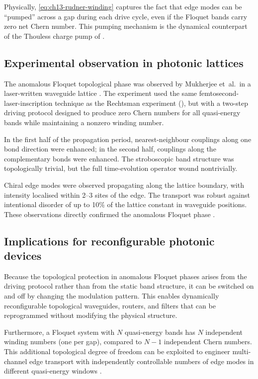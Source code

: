Physically, \eqref{eq:ch13-rudner-winding} captures the fact that edge
modes can be ``pumped'' across a gap during each drive cycle, even if
the Floquet bands carry zero net Chern number.  This pumping mechanism
is the dynamical counterpart of the Thouless charge pump of
 \cite{thouless1982quantized}.

\subsection{Experimental observation in photonic lattices}
\label{sec:ch13-anomalous-exp}

The anomalous Floquet topological phase was observed by Mukherjee
et~al.\ in a laser-written waveguide lattice
\cite{mukherjee2017experimental}.  The experiment used the same
femtosecond-laser-inscription technique as the Rechtsman experiment
(), but with a two-step driving
protocol designed to produce zero Chern numbers for all quasi-energy
bands while maintaining a nonzero winding number.

In the first half of the propagation period, nearest-neighbour
couplings along one bond direction were enhanced; in the second half,
couplings along the complementary bonds were enhanced.  The
stroboscopic band structure was topologically trivial, but the full
time-evolution operator wound nontrivially.

Chiral edge modes were observed propagating along the lattice
boundary, with intensity localised within 2--3 sites of the edge.
The transport was robust against intentional disorder of up to 10\%
of the lattice constant in waveguide positions.  These observations
directly confirmed the anomalous Floquet phase
\cite{mukherjee2017experimental}.

\subsection{Implications for reconfigurable photonic devices}
\label{sec:ch13-anomalous-implications}

Because the topological protection in anomalous Floquet phases arises
from the driving protocol rather than from the static band structure,
it can be switched on and off by changing the modulation pattern.
This enables dynamically reconfigurable topological waveguides,
routers, and filters that can be reprogrammed without modifying the
physical structure.

Furthermore, a Floquet system with $N$ quasi-energy bands has $N$
independent winding numbers (one per gap), compared to $N-1$
independent Chern numbers.  This additional topological degree of
freedom can be exploited to engineer multi-channel edge transport with
independently controllable numbers of edge modes in different
quasi-energy windows \cite{ozawa2018topological}.

